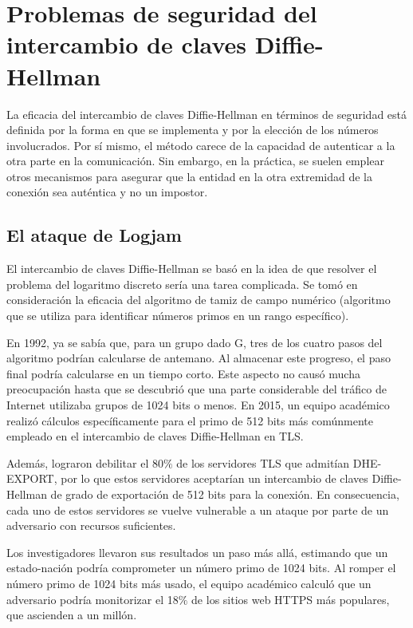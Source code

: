 \documentclass[11pt]{article}
\begin{document}
\section{Problemas de seguridad del intercambio de claves Diffie-Hellman}
La eficacia del intercambio de claves Diffie-Hellman en términos de seguridad está definida por la forma en que se implementa y por la elección de los números involucrados. Por sí mismo, el método carece de la capacidad de autenticar a la otra parte en la comunicación. Sin embargo, en la práctica, se suelen emplear otros mecanismos para asegurar que la entidad en la otra extremidad de la conexión sea auténtica y no un impostor.

\subsection {El ataque de Logjam}

El intercambio de claves Diffie-Hellman se basó en la idea de que resolver el problema del logaritmo discreto sería una tarea complicada. Se tomó en consideración la eficacia del algoritmo de tamiz de campo numérico (algoritmo que se utiliza para identificar números primos en un rango específico).

En 1992, ya se sabía que, para un grupo dado G, tres de los cuatro pasos del algoritmo podrían calcularse de antemano. Al almacenar este progreso, el paso final podría calcularse en un tiempo corto. Este aspecto no causó mucha preocupación hasta que se descubrió que una parte considerable del tráfico de Internet utilizaba grupos de 1024 bits o menos. En 2015, un equipo académico realizó cálculos específicamente para el primo de 512 bits más comúnmente empleado en el intercambio de claves Diffie-Hellman en TLS.

Además, lograron debilitar el 80$\%$ de los servidores TLS que admitían DHE-EXPORT, por lo que estos servidores aceptarían un intercambio de claves Diffie-Hellman de grado de exportación de 512 bits para la conexión. En consecuencia, cada uno de estos servidores se vuelve vulnerable a un ataque por parte de un adversario con recursos suficientes.

Los investigadores llevaron sus resultados un paso más allá, estimando que un estado-nación podría comprometer un número primo de 1024 bits. Al romper el número primo de 1024 bits más usado, el equipo académico calculó que un adversario podría monitorizar el 18$\%$ de los sitios web HTTPS más populares, que ascienden a un millón.
\end{document}
